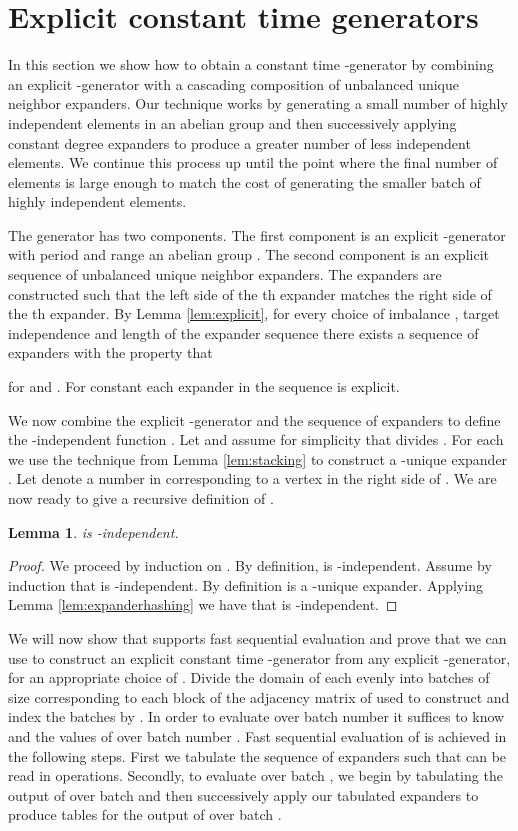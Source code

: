 \documentclass[a4paper,11pt]{article}
\theoremstyle{plain}
\newtheorem{lemma}{Lemma}
\theoremstyle{definition}
\begin{document}
\section{Explicit constant time generators} \label{sec:explicit}
In this section we show how to obtain a constant time \mbox{-generator} by combining an explicit -generator with a cascading composition of unbalanced unique neighbor expanders. 
Our technique works by generating a small number of highly independent elements in an abelian group and then successively applying constant degree expanders to produce a greater number of less independent elements. 
We continue this process up until the point where the final number of elements is large enough to match the cost of generating the smaller batch of highly independent elements.    

The generator has two components.
The first component is an explicit -generator  with period  and range an abelian group .
The second component is an explicit sequence  of unbalanced unique neighbor expanders.
The expanders are constructed such that the left side of the th expander matches the right side of the th expander.
By Lemma \ref{lem:explicit}, for every choice of imbalance , target independence  and length of the expander sequence  there exists a sequence of expanders with the property that 

for  and .
For constant  each expander in the sequence is explicit.

We now combine the explicit -generator  and the sequence of expanders  to define the -independent function .
Let  and assume for simplicity that  divides . 
For each  we use the technique from Lemma \ref{lem:stacking} to construct a -unique expander .
Let  denote a number in  corresponding to a vertex in the right side of . 
We are now ready to give a recursive definition of .

\begin{lemma}
 is -independent. 
\end{lemma}
\begin{proof}
We proceed by induction on . 
By definition,  is -independent.
Assume by induction that  is -independent.
By definition  is a -unique expander.
Applying Lemma \ref{lem:expanderhashing} we have that  is -independent.
\end{proof}

We will now show that  supports fast sequential evaluation and prove that we can use  to construct an explicit constant time -generator from any explicit \mbox{-generator}, for an appropriate choice of .
Divide the domain of each  evenly into  batches of size  corresponding to each block of the adjacency matrix of  used to construct  and index the batches by . 
In order to evaluate  over batch number  it suffices to know  and the values of  over batch number .
Fast sequential evaluation of  is achieved in the following steps.
First we tabulate the sequence of expanders  such that  can be read in  operations.
Secondly, to evaluate  over batch , we begin by tabulating the output of  over batch  and then successively apply our tabulated expanders to produce tables for the output of  over batch .
\end{document}
